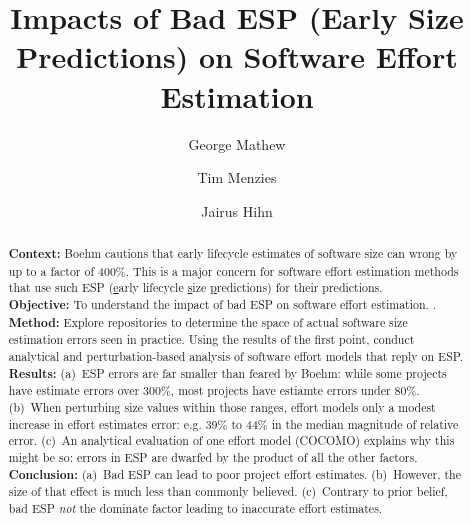 \documentclass[final,twocolumn,5p]{elsarticle}
\begin{document}
\begin{frontmatter}
\title{ Impacts of Bad ESP (Early Size Predictions) on Software Effort Estimation}
\author{George Mathew}
\author{Tim Menzies}
\author{Jairus Hihn}
\address{Department of Computer Science, North Carolina State University, Raleigh, NC, USA,\\
Jet Propulsion Laboratory, Pasadena, CA}




\begin{abstract}
  \textbf{Context:}
  Boehm cautions that early lifecycle estimates of software size
  can wrong by up to a factor of 400\%. This is a
  major concern for software effort estimation methods that use such ESP
  (\underline{e}arly lifecycle \underline{s}ize \underline{p}redictions)
  for their predictions.\\
  \textbf{Objective:} To understand the impact of  bad ESP on software effort
  estimation. .\\
\textbf{Method:} Explore repositories to determine the space of actual software
size estimation errors seen in practice.  Using the results of the first point, conduct
analytical and perturbation-based  analysis of software
effort models that reply on ESP. \\
\textbf{Results:} (a)~ESP errors are far smaller than   feared by Boehm:
while some
projects have estimate errors over 300\%, most
projects have estiamte errors under  80\%. 
(b)~When perturbing size values within those ranges,
effort models 
only a modest increase in effort estimates error: e.g. 39\% to 44\% in the  median magnitude of relative error. (c)~An analytical evaluation of one effort
model (COCOMO) explains why this might be so:   errors in ESP
are dwarfed by the product of all the other factors.\\
\textbf{Conclusion:} (a)~Bad ESP can lead to poor project effort estimates. (b)~However,
the size of that effect is much less than commonly believed.
(c)~Contrary to prior belief, bad ESP {\em not} the dominate factor leading to inaccurate effort estimates.
\end{abstract}
\end{frontmatter}
\end{document}
